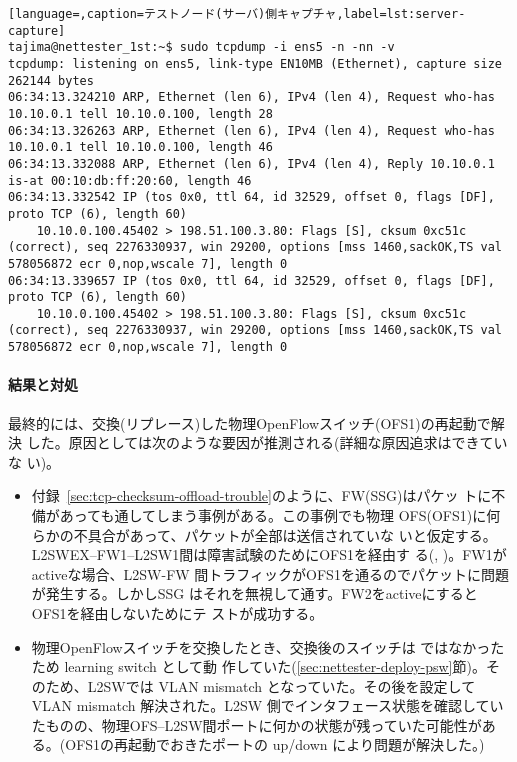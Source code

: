 \begin{lstlisting}[language=,caption=テストノード(サーバ)側キャプチャ,label=lst:server-capture]
tajima@nettester_1st:~$ sudo tcpdump -i ens5 -n -nn -v
tcpdump: listening on ens5, link-type EN10MB (Ethernet), capture size 262144 bytes
06:34:13.324210 ARP, Ethernet (len 6), IPv4 (len 4), Request who-has 10.10.0.1 tell 10.10.0.100, length 28
06:34:13.326263 ARP, Ethernet (len 6), IPv4 (len 4), Request who-has 10.10.0.1 tell 10.10.0.100, length 46
06:34:13.332088 ARP, Ethernet (len 6), IPv4 (len 4), Reply 10.10.0.1 is-at 00:10:db:ff:20:60, length 46
06:34:13.332542 IP (tos 0x0, ttl 64, id 32529, offset 0, flags [DF], proto TCP (6), length 60)
    10.10.0.100.45402 > 198.51.100.3.80: Flags [S], cksum 0xc51c (correct), seq 2276330937, win 29200, options [mss 1460,sackOK,TS val 578056872 ecr 0,nop,wscale 7], length 0
06:34:13.339657 IP (tos 0x0, ttl 64, id 32529, offset 0, flags [DF], proto TCP (6), length 60)
    10.10.0.100.45402 > 198.51.100.3.80: Flags [S], cksum 0xc51c (correct), seq 2276330937, win 29200, options [mss 1460,sackOK,TS val 578056872 ecr 0,nop,wscale 7], length 0
\end{lstlisting}

    \paragraph{結果と対処}

最終的には、交換(リプレース)した物理OpenFlowスイッチ(OFS1)の再起動で解決
した。原因としては次のような要因が推測される(詳細な原因追求はできていな
い)。
\begin{itemize}
 \item 付録~\ref{sec:tcp-checksum-offload-trouble}のように、FW(SSG)はパケッ
       トに不備があっても通してしまう事例がある。この事例でも物理
       OFS(OFS1)に何らかの不具合があって、パケットが全部は送信されていな
       いと仮定する。L2SWEX--FW1--L2SW1間は障害試験のためにOFS1を経由す
       る(,
       )。FW1がactiveな場合、L2SW-FW
       間トラフィックがOFS1を通るのでパケットに問題が発生する。しかしSSG
       はそれを無視して通す。FW2をactiveにするとOFS1を経由しないためにテ
       ストが成功する。
 \item 物理OpenFlowスイッチを交換したとき、交換後のスイッチは
       ではなかったため learning switch として動
       作していた(\ref{sec:nettester-deploy-psw}節)。そのため、L2SWでは
       VLAN mismatch となっていた。その後を設定して
       VLAN mismatch 解決された。L2SW 側でインタフェース状態を確認してい
       たものの、物理OFS--L2SW間ポートに何かの状態が残っていた可能性があ
       る。(OFS1の再起動でおきたポートの up/down により問題が解決した。)
\end{itemize}

